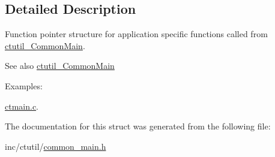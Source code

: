 \subsection{Detailed Description}
Function pointer structure for application specific functions called from \hyperlink{common__main_8h_acdf79a4af11e90b4e9e4f2f899c44c48}{ctutil\+\_\+\+Common\+Main}. \begin{DoxySeeAlso}{See also}
\hyperlink{common__main_8h_acdf79a4af11e90b4e9e4f2f899c44c48}{ctutil\+\_\+\+Common\+Main} 
\end{DoxySeeAlso}
\begin{Desc}
\item[Examples\+: ]\par
\hyperlink{ctmain_8c-example}{ctmain.\+c}.\end{Desc}


The documentation for this struct was generated from the following file\+:\begin{DoxyCompactItemize}
\item 
inc/ctutil/\hyperlink{common__main_8h}{common\+\_\+main.\+h}\end{DoxyCompactItemize}
